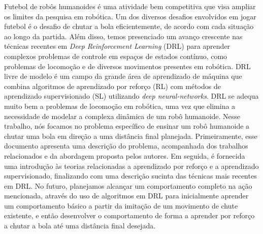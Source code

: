 
Futebol de rob\^os humanoides \'e uma atividade bem competitiva que visa ampliar os limites da pesquisa em rob\'otica. Um dos diversos desafios envolvidos em jogar futebol \'e o desafio de chutar a bola eficientemente, de acordo com cada situa\c c\~ao ao longo da partida. Al\'em disso, temos presenciado um avan\c co crescente nas t\'ecnicas recentes em \textit{Deep Reinforcement Learning} (DRL) para aprender complexos problemas de controle em espa\c cos de estados cont\'inuo, como problemas de locomo\c c\~ao e de diversos movimentos presentes em rob\'otica. DRL livre de modelo \'e um campo da grande \'area de aprendizado de m\'aquina que combina algoritmos de aprendizado por refor\c co (RL) com m\'etodos de aprendizado supervisionado (SL) utilizando \textit{deep neural-networks}. DRL se adequa muito bem a problemas de locomo\c c\~ao em rob\'otica, uma vez que elimina a necessidade de modelar a complexa din\^amica de um rob\^o humanoide. Nesse trabalho, n\'os focamos no problema espec\'ifico de ensinar um rob\^o humanoide a chutar uma bola em dire\c c\~ao a uma dist\^ancia final planejada. Primeiramente, esse documento apresenta uma descri\c c\~ao do problema, acompanhada dos trabalhos relacionados e da abordagem proposta pelos autores. Em seguida, \'e fornecida uma introdu\c c\~ao \`as teorias relacionadas a aprendizado por refor\c co e a aprendizado supervisionado, finalizando com uma descri\c c\~ao sucinta das t\'ecnicas mais recentes em DRL. No futuro, planejamos alcan\c car um comportamento completo na a\c c\~ao mencionada, atrav\'es do uso de algoritmos em DRL para inicialmente aprender um comportamento b\'asico a partir da imita\c c\~ao de um movimento de chute existente, e ent\~ao desenvolver o comportamento de forma a aprender por refor\c co a chutar a bola at\'e uma dist\^ancia final desejada.

